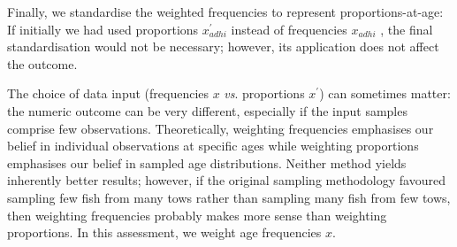 Finally, we standardise the weighted frequencies to represent proportions-at-age:
%
%
If initially we had used proportions $x_{adhi}^\prime$ instead of frequencies $x_{adhi}$ , the final standardisation would not be necessary; however, its application does not affect the outcome.

The choice of data input (frequencies $x$ \emph{vs}. proportions $x^\prime$) can sometimes matter: the numeric outcome can be very different, especially if the input samples comprise few observations. Theoretically, weighting frequencies emphasises our belief in individual observations at specific ages while weighting proportions emphasises our belief in sampled age distributions. Neither method yields inherently better results; however, if the original sampling methodology favoured sampling few fish from many tows rather than sampling many fish from few tows, then weighting frequencies probably makes more sense than weighting proportions. In this assessment, we weight age frequencies $x$.

